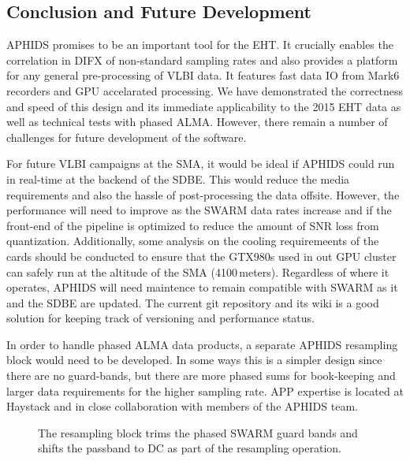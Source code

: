 \documentclass[11pt,preprint]{aastex}
\begin{document}
\subsection{Conclusion and Future Development}

APHIDS promises to be an important tool for the EHT.  It crucially enables the correlation in
DIFX of non-standard sampling rates and also provides a platform for any general pre-processing of 
VLBI data.  It features fast data IO from Mark6 recorders and GPU accelarated processing.  
We have demonstrated the correctness and speed of this design and its immediate applicability to 
the 2015 EHT data as well as technical tests with phased ALMA.  However,
there remain a number of challenges for future development of the software.

For future VLBI campaigns at the SMA, it would be ideal if APHIDS could run in real-time 
at the backend of the SDBE.  This would reduce the media requirements and also the 
hassle of post-processing the data offsite.  However, the performance will need to improve as the
SWARM data rates increase and if the front-end of the pipeline is optimized to reduce the 
amount of SNR loss from quantization.  Additionally, some analysis on the cooling requiremeents 
of the cards should be conducted to ensure that the GTX980s used in out GPU cluster can safely run 
at the altitude of the SMA (4100\,meters).  Regardless of where it operates, APHIDS will need 
maintence to remain compatible with SWARM as it and the SDBE are updated.  The current 
git repository and its wiki is a good solution for keeping track of versioning and performance status.

In order to handle phased ALMA data products, a separate APHIDS resampling block would need 
to be developed.  In some ways this is a simpler design since there are no guard-bands, but 
there are more phased sums for book-keeping and larger data requirements for the higher 
sampling rate. APP expertise is located at Haystack and in close collaboration with members of 
the APHIDS team.  

\begin{figure}
\centering
{}
\label{fig:resampling_block}
\caption{The resampling block trims the phased SWARM guard bands and shifts the passband to DC as part of the 
resampling operation.}
\end{figure}
\end{document}
